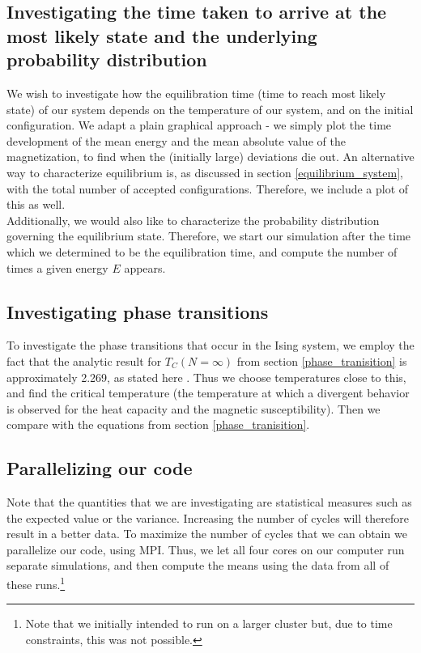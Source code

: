 \documentclass[a4paper, 10pt]{article}
\begin{document}
\subsection{Investigating the time taken to arrive at the most likely state and the underlying probability distribution}
We wish to investigate how the equilibration time (time to reach most likely state) of our system depends on the temperature of our system, and on the initial configuration. We adapt a plain graphical approach - we simply plot the time development of the mean energy and the mean absolute value of the magnetization, to find when the (initially large) deviations die out. An alternative way to characterize equilibrium is, as discussed in section \ref{equilibrium_system}, with the total number of accepted configurations. Therefore, we include a plot of this as well.\\
\linebreak
Additionally, we would also like to characterize the probability distribution governing the equilibrium state. Therefore, we start our simulation after the time which we determined to be the equilibration time, and compute the number of times a given energy $E$ appears.
\subsection{Investigating phase transitions}
To investigate the phase transitions that occur in the Ising system, we employ the fact that the analytic result for $T_C(N=\infty)$ from section \ref{phase_tranisition} is approximately 2.269, as stated here \cite{Project}. Thus we choose temperatures close to this, and find the critical temperature (the temperature at which a divergent behavior is observed for the heat capacity and the magnetic susceptibility). Then we compare with the equations from section \ref{phase_tranisition}.
\subsection{Parallelizing our code}
Note that the quantities that we are investigating are statistical measures such as the expected value or the variance. Increasing the number of cycles will therefore result in a better data. To maximize the number of cycles that we can obtain we parallelize our code, using MPI. Thus, we let all four cores on our computer run separate simulations, and then compute the means using the data from all of these runs.\footnote{Note that we initially intended to run on a larger cluster but, due to time constraints, this was not possible.}
\end{document}
